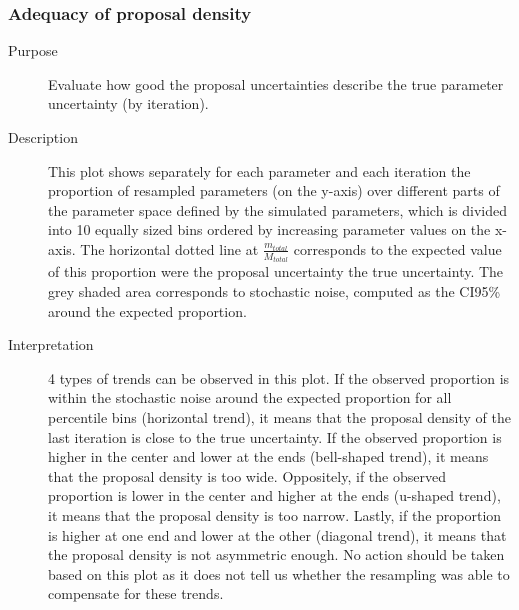 \subsubsection{Adequacy of proposal density}
\begin{description}
\item[Purpose] Evaluate how good the proposal uncertainties describe the true parameter uncertainty (by iteration).
\item[Description] This plot shows separately for each parameter and each iteration the proportion of resampled parameters (on the y-axis) over different parts of the parameter space defined by the simulated parameters, which is divided into 10 equally sized bins ordered by increasing parameter values on the x-axis. 
The horizontal dotted line at $\frac{m_{total}}{M_{total}}$ 
corresponds to the expected value of this proportion were the proposal uncertainty the true uncertainty. The grey shaded area corresponds to stochastic noise, computed as the CI95\% 
around the expected proportion.
\item[Interpretation] 4 types of trends can be observed in this plot. If the observed proportion is within the stochastic noise around the expected proportion for all percentile bins (horizontal trend), it means that the proposal density of the last iteration is close to the true uncertainty. If the observed proportion is higher in the center and lower at the ends (bell-shaped trend), it means that the proposal density is too wide. Oppositely, if the observed proportion is lower in the center and higher at the ends (u-shaped trend), it means that the proposal density is too narrow. Lastly, if the proportion is higher at one end and lower at the other (diagonal trend), it means that the proposal density is not asymmetric enough. No action should be taken based on this plot as it does not tell us whether the resampling was able to compensate for these trends.
\end{description}

